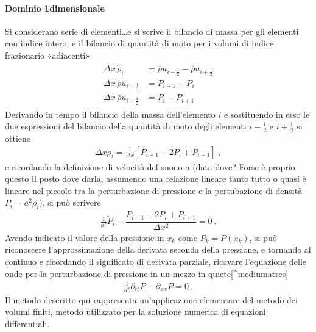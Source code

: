 \documentclass[letterpaper,10pt,italian]{jupyterBook}
\begin{document}
\paragraph{Dominio 1\sphinxhyphen{}dimensionale}
\label{\detokenize{ch/waves/waves-in-physics:dominio-1-dimensionale}}\label{\detokenize{ch/waves/waves-in-physics:physics-hs-waves-equation-examples-fluids-sound-1d}}
\sphinxAtStartPar
Si considerano serie di elementi…e si scrive il bilancio di massa per gli elementi con indice intero, e il bilancio di quantità di moto per i volumi di indice frazionario «adiacenti»
\begin{equation*}
\begin{split}\begin{aligned}
  \Delta x \, \dot{\rho}_i & = \overline{\rho} u_{i-\frac{1}{2}} - \overline{\rho} u_{i+\frac{1}{2}} \\
  \Delta x \, \overline{\rho} \dot{u}_{i-\frac{1}{2}} & = P_{i-1} - P_{i} \\
  \Delta x \, \overline{\rho} \dot{u}_{i+\frac{1}{2}} & = P_{i  } - P_{i+1}  
\end{aligned}\end{split}
\end{equation*}
\sphinxAtStartPar
Derivando in tempo il bilancio della massa dell’elemento \(i\) e sostituendo in esso le due espressioni del bilancio della quantità di moto degli elementi \(i-\frac{1}{2}\) e \(i+\frac{1}{2}\) si ottiene
\begin{equation*}
\begin{split}\Delta x \ddot{\rho}_i = \frac{1}{\Delta x} \left[ P_{i-1} - 2 P_i + P_{i+1} \right] \ ,\end{split}
\end{equation*}
\sphinxAtStartPar
e ricordando la definizione di velocità del suono \(a\)  (data dove? Forse è proprio questo il posto dove darla, assumendo una relazione lineare \sphinxhyphen{} tanto tutto o quasi è lineare nel piccolo \sphinxhyphen{} tra la perturbazione di pressione e la pertubazione di densità \(P_i = a^2 \rho_i\)), si può scrivere
\begin{equation*}
\begin{split}\frac{1}{a^2} \ddot{P}_i - \dfrac{P_{i-1} - 2 P_i + P_{i+1}}{\Delta x^2} = 0 \ .\end{split}
\end{equation*}
\sphinxAtStartPar
Avendo indicato il valore della pressione in \(x_k\) come \(P_k = P(x_k)\), si può riconoscere l’approssimazione della derivata seconda della pressione, e tornando al continuo e ricordando il significato di derivata parziale, ricavare l’equazione delle onde per la perturbazione di pressione in un mezzo in quiete{[}\textasciicircum{}medium\sphinxhyphen{}at\sphinxhyphen{}res{]}
\begin{equation*}
\begin{split}\frac{1}{a^2} \partial_{tt} P - \partial_{xx} P = 0 \ .\end{split}
\end{equation*}
\sphinxAtStartPar
{} Il metodo descritto qui rappresenta un’applicazione elementare del metodo dei volumi finiti, metodo utilizzato per la soluzione numerica di equazioni differentiali.
\end{document}
